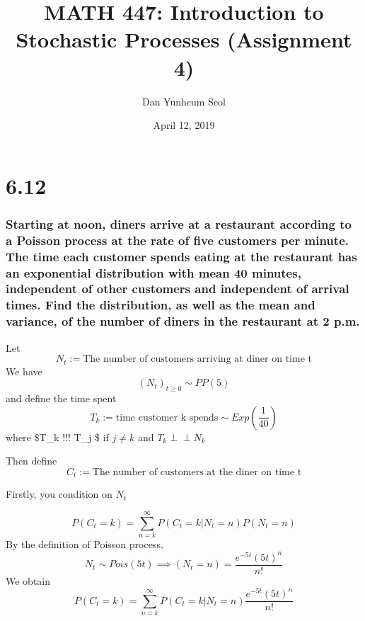 \documentclass[]{article}
\title{MATH 447: Introduction to Stochastic Processes (Assignment 4)}
\author{Dan Yunheum Seol}
\date{April 12, 2019}
\begin{document}
\maketitle

\hypertarget{section}{%
\section{6.12}\label{section}}

\hypertarget{starting-at-noon-diners-arrive-at-a-restaurant-according-to-a-poisson-process-at-the-rate-of-five-customers-per-minute.-the-time-each-customer-spends-eating-at-the-restaurant-has-an-exponential-distribution-with-mean-40-minutes-independent-of-other-customers-and-independent-of-arrival-times.-find-the-distribution-as-well-as-the-mean-and-variance-of-the-number-of-diners-in-the-restaurant-at-2-p.m.}{%
\subsubsection{Starting at noon, diners arrive at a restaurant according
to a Poisson process at the rate of five customers per minute. The time
each customer spends eating at the restaurant has an exponential
distribution with mean 40 minutes, independent of other customers and
independent of arrival times. Find the distribution, as well as the mean
and variance, of the number of diners in the restaurant at 2
p.m.}\label{starting-at-noon-diners-arrive-at-a-restaurant-according-to-a-poisson-process-at-the-rate-of-five-customers-per-minute.-the-time-each-customer-spends-eating-at-the-restaurant-has-an-exponential-distribution-with-mean-40-minutes-independent-of-other-customers-and-independent-of-arrival-times.-find-the-distribution-as-well-as-the-mean-and-variance-of-the-number-of-diners-in-the-restaurant-at-2-p.m.}}

Let \[
N_t := \text{The number of customers arriving at diner on time t}
\] We have \[
(N_t)_{t \geq 0} \sim PP(5)
\] and define the time spent \[
T_k := \text{time customer k spends} \sim Exp(\frac{1}{40})
\] where \$T\_k \perp !!! \perp T\_j \$ if \(j \neq k\) and
\(T_k \perp \!\!\! \perp N_k\)

Then define\\
\[
C_t := \text{The number of customers at the diner on time t} 
\]

Firstly, you condition on \(N_t\)

\[
P(C_t = k) = \sum_{n=k}^\infty P(C_t = k | N_t = n)P(N_t = n)
\] By the definition of Poisson process, \[
N_t \sim Pois(5t) \implies (N_t = n) = \frac{e^{-5t}(5t)^n}{n!} 
\] We obtain \[
P(C_t = k) = \sum_{n=k}^\infty P(C_t = k | N_t = n)\frac{e^{-5t}(5t)^n}{n!}
\]
\end{document}
